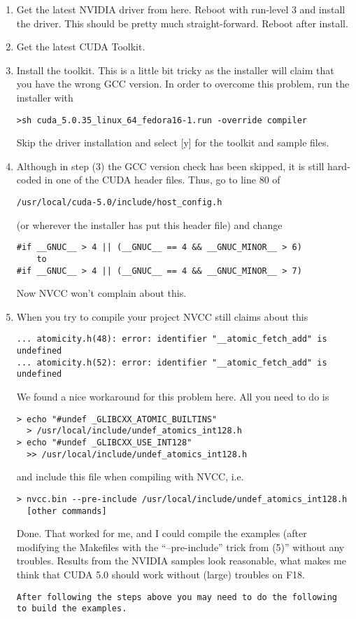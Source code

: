 \begin{enumerate}
\item Get the latest NVIDIA driver from here. Reboot with run-level 3 and install the driver. This should be pretty much straight-forward. Reboot after install.
\item Get the latest CUDA Toolkit.
\item Install the toolkit. This is a little bit tricky as the installer will claim that you have the wrong GCC version. In order to overcome this problem, run the installer with
\begin{verbatim}
>sh cuda_5.0.35_linux_64_fedora16-1.run -override compiler
\end{verbatim}
Skip the driver installation and select [y] for the toolkit and sample files.
\item Although in step (3) the GCC version check has been skipped, it is still hard-coded in one of the CUDA header files. Thus, go to line 80 of
\begin{verbatim}
/usr/local/cuda-5.0/include/host_config.h \end{verbatim} (or wherever the installer has put this header file) and change
\begin{verbatim}
#if __GNUC__ > 4 || (__GNUC__ == 4 && __GNUC_MINOR__ > 6)
    to
#if __GNUC__ > 4 || (__GNUC__ == 4 && __GNUC_MINOR__ > 7)
\end{verbatim}
Now NVCC won’t complain about this.
\item When you try to compile your project NVCC still claims about this
\begin{verbatim}
... atomicity.h(48): error: identifier "__atomic_fetch_add" is undefined
... atomicity.h(52): error: identifier "__atomic_fetch_add" is undefined
\end{verbatim}
We found a nice workaround for this problem here. All you need to do is
\begin{verbatim}
> echo "#undef _GLIBCXX_ATOMIC_BUILTINS" 
  > /usr/local/include/undef_atomics_int128.h
> echo "#undef _GLIBCXX_USE_INT128" 
  >> /usr/local/include/undef_atomics_int128.h
\end{verbatim}
and include this file when compiling with NVCC, i.e.
\begin{verbatim}
> nvcc.bin --pre-include /usr/local/include/undef_atomics_int128.h
  [other commands]
\end{verbatim}
Done. That worked for me, and I could compile the examples (after modifying the Makefiles with the “--pre-include” trick from (5)” without any troubles. Results from the NVIDIA samples look reasonable, what makes me think that CUDA 5.0 should work without (large) troubles on F18.\\
\begin{verbatim}
After following the steps above you may need to do the following
to build the examples.


\end{verbatim}
\end{enumerate}
